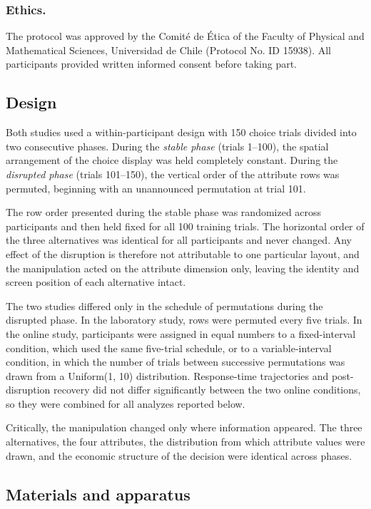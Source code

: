 \documentclass[man,natbib,floatsintext]{apa7}
\begin{document}
\subsubsection{Ethics.} The protocol was approved by the Comit\'{e} de \'{E}tica of the Faculty of Physical and Mathematical Sciences, Universidad de Chile (Protocol No. ID 15938). All participants provided written informed consent before taking part.

\subsection{Design}

Both studies used a within-participant design with 150 choice trials divided into two consecutive phases. During the \emph{stable phase} (trials 1--100), the spatial arrangement of the choice display was held completely constant. During the \emph{disrupted phase} (trials 101--150), the vertical order of the attribute rows was permuted, beginning with an unannounced permutation at trial 101.

The row order presented during the stable phase was randomized across participants and then held fixed for all 100 training trials. The horizontal order of the three alternatives was identical for all participants and never changed. Any effect of the disruption is therefore not attributable to one particular layout, and the manipulation acted on the attribute dimension only, leaving the identity and screen position of each alternative intact.

The two studies differed only in the schedule of permutations during the disrupted phase. In the laboratory study, rows were permuted every five trials. In the online study, participants were assigned in equal numbers to a fixed-interval condition, which used the same five-trial schedule, or to a variable-interval condition, in which the number of trials between successive permutations was drawn from a Uniform(1, 10) distribution. Response-time trajectories and post-disruption recovery did not differ significantly between the two online conditions, so they were combined for all analyzes reported below.

Critically, the manipulation changed only where information appeared. The three alternatives, the four attributes, the distribution from which attribute values were drawn, and the economic structure of the decision were identical across phases.

\subsection{Materials and apparatus}
\end{document}
